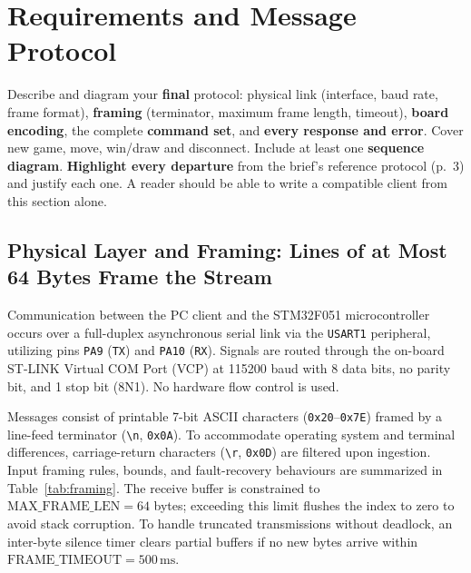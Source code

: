 \section{Requirements and Message Protocol}
\label{sec:protocol}

\begin{guidance}
Describe and diagram your \textbf{final} protocol: physical link (interface,
baud rate, frame format), \textbf{framing} (terminator, maximum frame length,
timeout), \textbf{board encoding}, the complete \textbf{command set}, and
\textbf{every response and error}. Cover new game, move, win/draw and
disconnect. Include at least one \textbf{sequence diagram}. \textbf{Highlight
every departure} from the brief's reference protocol (p.~3) and justify each
one. A reader should be able to write a compatible client from this section
alone.
\end{guidance}

\subsection{Physical Layer and Framing: Lines of at Most 64 Bytes Frame the Stream}
Communication between the PC client and the STM32F051 microcontroller occurs over a full-duplex asynchronous serial link via the \texttt{USART1} peripheral, utilizing pins \texttt{PA9} (\texttt{TX}) and \texttt{PA10} (\texttt{RX}). Signals are routed through the on-board ST-LINK Virtual COM Port (VCP) at 115200 baud with 8 data bits, no parity bit, and 1 stop bit (8N1). No hardware flow control is used.

Messages consist of printable 7-bit ASCII characters (\texttt{0x20}--\texttt{0x7E}) framed by a line-feed terminator (\texttt{\textbackslash n}, \texttt{0x0A}). To accommodate operating system and terminal differences, carriage-return characters (\texttt{\textbackslash r}, \texttt{0x0D}) are filtered upon ingestion. Input framing rules, bounds, and fault-recovery behaviours are summarized in Table~\ref{tab:framing}. The receive buffer is constrained to $\text{MAX\_FRAME\_LEN} = 64$ bytes; exceeding this limit flushes the index to zero to avoid stack corruption. To handle truncated transmissions without deadlock, an inter-byte silence timer clears partial buffers if no new bytes arrive within $\text{FRAME\_TIMEOUT} = 500\,\text{ms}$.

